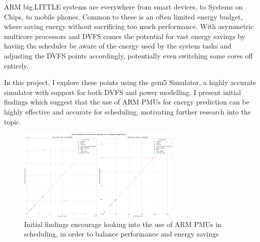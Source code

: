 ARM big.LITTLE systems are everywhere from smart devices, to Systems on Chips, 
to mobile phones. Common to these is an often limited energy budget, where 
saving energy without sacrificing too much performance. With asymmetric 
multicore processors and DVFS comes the potential for vast energy savings by 
having the scheduler be aware of the energy used by the system tasks and 
adjusting the DVFS points accordingly, potentially even switching some cores 
off entirely.

In this project, I explore these points using the gem5 Simulator, a highly 
accurate simulator with support for both DVFS and power modelling. I present 
initial findings which suggest that the use of ARM PMUs for energy prediction 
can be highly effective and accurate for scheduling, motivating further research
into the topic.

\begin{figure}[H]
    \centering
    \includegraphics[width=0.7\textwidth]{result-plots/stock-2b2L/system-scatter.png}
    \caption{Initial findings encourage looking into the use of ARM PMUs in
             scheduling, in order to balance performance and energy savings}
\end{figure}
